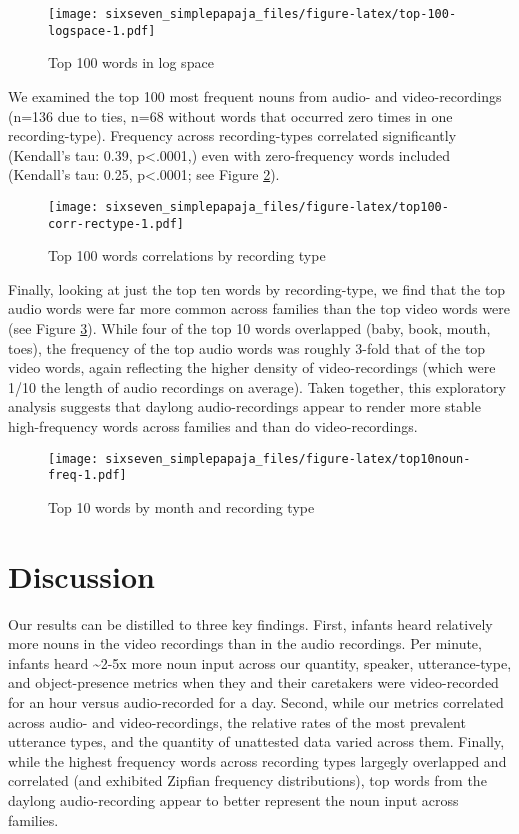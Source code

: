 \documentclass[floatsintext,man]{apa6}
\theoremstyle{definition}
\theoremstyle{definition}
\theoremstyle{definition}
\theoremstyle{remark}
\begin{document}
\begin{figure}
\centering
\texttt{[image: sixseven\_simplepapaja\_files/figure-latex/top-100-logspace-1.pdf]}
\caption{\label{fig:top-100-logspace}Top 100 words in log space}
\end{figure}

We examined the top 100 most frequent nouns from audio- and
video-recordings (n=136 due to ties, n=68 without words that occurred
zero times in one recording-type). Frequency across recording-types
correlated significantly (Kendall's tau: 0.39, p\textless{}.0001,) even
with zero-frequency words included (Kendall's tau: 0.25,
p\textless{}.0001; see Figure \ref{fig:top100-corr-rectype}).

\begin{figure}
\centering
\texttt{[image: sixseven\_simplepapaja\_files/figure-latex/top100-corr-rectype-1.pdf]}
\caption{\label{fig:top100-corr-rectype}Top 100 words correlations by
recording type}
\end{figure}

Finally, looking at just the top ten words by recording-type, we find
that the top audio words were far more common across families than the
top video words were (see Figure \ref{fig:top10noun-freq}). While four
of the top 10 words overlapped (baby, book, mouth, toes), the frequency
of the top audio words was roughly 3-fold that of the top video words,
again reflecting the higher density of video-recordings (which were 1/10
the length of audio recordings on average). Taken together, this
exploratory analysis suggests that daylong audio-recordings appear to
render more stable high-frequency words across families and than do
video-recordings.

\begin{figure}
\centering
\texttt{[image: sixseven\_simplepapaja\_files/figure-latex/top10noun-freq-1.pdf]}
\caption{\label{fig:top10noun-freq}Top 10 words by month and recording type}
\end{figure}

\section{Discussion}\label{discussion}

Our results can be distilled to three key findings. First, infants heard
relatively more nouns in the video recordings than in the audio
recordings. Per minute, infants heard \textasciitilde{}2-5x more noun
input across our quantity, speaker, utterance-type, and object-presence
metrics when they and their caretakers were video-recorded for an hour
versus audio-recorded for a day. Second, while our metrics correlated
across audio- and video-recordings, the relative rates of the most
prevalent utterance types, and the quantity of unattested data varied
across them. Finally, while the highest frequency words across recording
types largegly overlapped and correlated (and exhibited Zipfian
frequency distributions), top words from the daylong audio-recording
appear to better represent the noun input across families.
\end{document}
